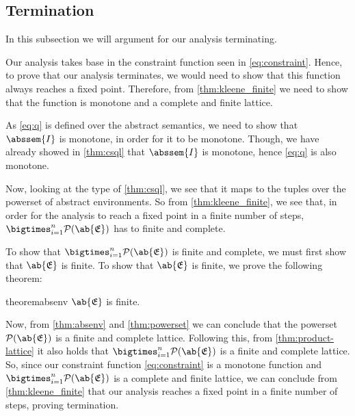 \subsection{Termination}\label{subsec:termination}

In this subsection we will argument for our analysis terminating.

Our analysis takes base in the constraint function seen in \autoref{eq:constraint}.
Hence, to prove that our analysis terminates, we would need to show that this function always reaches a fixed point.
Therefore, from \autoref{thm:kleene_finite} we need to show that the function is monotone and a complete and finite lattice.

As \autoref{eq:q} is defined over the abstract semantics, we need to show that $\abssem{I}$ is monotone, in order for it to be monotone.
Though, we have already showed in \autoref{thm:csql} that $\abssem{I}$ is monotone, hence \autoref{eq:q} is also monotone.

Now, looking at the type of \autoref{thm:csql}, we see that it maps to the tuples over the powerset of abstract environments.
So from \autoref{thm:kleene_finite}, we see that, in order for the analysis to reach a fixed point in a finite number of steps, $\bigtimes_{i = 1}^n \mathcal{P}(\ab{\mathfrak{E}})$ has to finite and complete.

To show that $\bigtimes_{i = 1}^n \mathcal{P}(\ab{\mathfrak{E}})$ is finite and complete, we must first show that $\ab{\mathfrak{E}}$ is finite.
To show that $\ab{\mathfrak{E}}$ is finite, we prove the following theorem:

\begin{restatable}{theorem}{absenv}\label{thm:absenv}
$\ab{\mathfrak{E}}$ is finite.
\end{restatable}

Now, from \autoref{thm:absenv} and \autoref{thm:powerset} we can conclude that the powerset $\mathcal{P}(\ab{\mathfrak{E}})$ is a finite and complete lattice.
Following this, from \autoref{thm:product-lattice} it also holds that $\bigtimes_{i = 1}^n \mathcal{P}(\ab{\mathfrak{E}})$ is a finite and complete lattice.
So, since our constraint function \autoref{eq:constraint} is a monotone function and $\bigtimes_{i = 1}^n \mathcal{P}(\ab{\mathfrak{E}})$ is a complete and finite lattice, we can conclude from \autoref{thm:kleene_finite} that our analysis reaches a fixed point in a finite number of steps, proving termination.